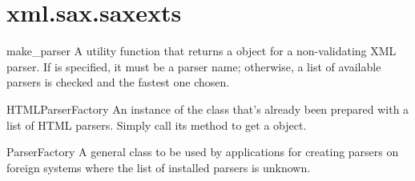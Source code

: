 \documentclass{howto}
\begin{document}



\section{{xml.sax.saxexts}}

\begin{funcdesc}{make_parser}{}
A utility function that returns a  object for a
non-validating XML parser.  If  is specified, it must be a 
parser name; otherwise, a list of available parsers is checked and the
fastest one chosen.
\end{funcdesc}

\begin{datadesc}{HTMLParserFactory}
An instance of the  class that's already been
prepared with a list of HTML parsers.  Simply call its
 method to get a  object. 
\end{datadesc}

\begin{classdesc}{ParserFactory}{}
A general class to be used by applications for creating parsers on
foreign systems where the list of installed parsers is unknown.
\end{classdesc}
\end{document}
